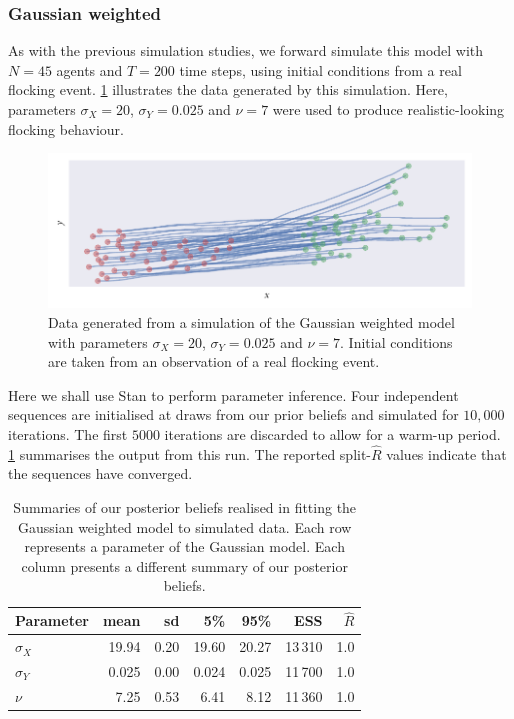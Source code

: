 \subsubsection{Gaussian weighted}

As with the previous simulation studies, we forward simulate this model with $N=45$ agents
and $T=200$ time steps, using initial conditions from a real flocking event.
\cref{fig:gauss_sim} illustrates the data generated by this simulation. Here,
parameters $\sigma_X=20$, $\sigma_Y=0.025$ and $\nu=7$ were used to produce
realistic-looking flocking behaviour.

\begin{figure}[tbp]
  \includegraphics{gauss_sim.pdf}
  \caption{Data generated from a simulation of the Gaussian weighted model with
    parameters $\sigma_X=20$, $\sigma_Y=0.025$ and $\nu=7$. Initial conditions are taken
    from an observation of a real flocking event.}
  \label{fig:gauss_sim}
\end{figure}

Here we shall use Stan to perform parameter inference. Four independent sequences are
initialised at draws from our prior beliefs and simulated for $10,000$ iterations. The
first $5000$ iterations are discarded to allow for a warm-up period.
\cref{tab:gauss_summary} summarises the output from this run. The reported
split-$\widehat{R}$ values indicate that the sequences have converged.

\begin{table}[tbp]
  \begin{tabular}{@{}lrrrrrr@{}}
    \toprule
    Parameter    & mean  & sd   & 5\%   & 95\%  & ESS     & $\widehat{R}$ \\
    \midrule
    $\sigma_{X}$ & 19.94 & 0.20 & 19.60 & 20.27 & 13\,310 & 1.0           \\
    $\sigma_{Y}$ & 0.025 & 0.00 & 0.024 & 0.025 & 11\,700 & 1.0           \\
    $\nu$        & 7.25  & 0.53 & 6.41  & 8.12  & 11\,360 & 1.0           \\
    \bottomrule
  \end{tabular}
  \caption{Summaries of our posterior beliefs realised in fitting the Gaussian weighted
    model to simulated data. Each row represents a parameter of the Gaussian model. Each
    column presents a different summary of our posterior beliefs.}
  \label{tab:gauss_summary}
\end{table}

